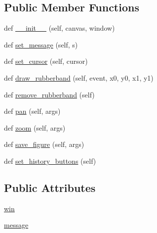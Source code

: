 \subsection*{Public Member Functions}
\begin{DoxyCompactItemize}
\item 
def \hyperlink{classmatplotlib_1_1backends_1_1backend__gtk3_1_1NavigationToolbar2GTK3_a44f0c09dae98b4a1d28de4ec2aa51824}{\+\_\+\+\_\+init\+\_\+\+\_\+} (self, canvas, window)
\item 
def \hyperlink{classmatplotlib_1_1backends_1_1backend__gtk3_1_1NavigationToolbar2GTK3_a5d93a7304eeac3de015b910a6f7deb79}{set\+\_\+message} (self, s)
\item 
def \hyperlink{classmatplotlib_1_1backends_1_1backend__gtk3_1_1NavigationToolbar2GTK3_afb5f5925aff9dbb9cd59b1b1ce18c288}{set\+\_\+cursor} (self, cursor)
\item 
def \hyperlink{classmatplotlib_1_1backends_1_1backend__gtk3_1_1NavigationToolbar2GTK3_ab05cfd7a22974a977b1b54d266f61f8f}{draw\+\_\+rubberband} (self, event, x0, y0, x1, y1)
\item 
def \hyperlink{classmatplotlib_1_1backends_1_1backend__gtk3_1_1NavigationToolbar2GTK3_ae753d6238f46be24a488c742d9a9d16a}{remove\+\_\+rubberband} (self)
\item 
def \hyperlink{classmatplotlib_1_1backends_1_1backend__gtk3_1_1NavigationToolbar2GTK3_ae6ef9c5493bec27282e6d66922513b8d}{pan} (self, args)
\item 
def \hyperlink{classmatplotlib_1_1backends_1_1backend__gtk3_1_1NavigationToolbar2GTK3_aceb3d50600ca50ec4c0fb3c25129dfdc}{zoom} (self, args)
\item 
def \hyperlink{classmatplotlib_1_1backends_1_1backend__gtk3_1_1NavigationToolbar2GTK3_a539d45c52b7fd84a20c0c7b5cb3608b6}{save\+\_\+figure} (self, args)
\item 
def \hyperlink{classmatplotlib_1_1backends_1_1backend__gtk3_1_1NavigationToolbar2GTK3_adc29aeec1686d962e8bf5120bad5353a}{set\+\_\+history\+\_\+buttons} (self)
\end{DoxyCompactItemize}
\subsection*{Public Attributes}
\begin{DoxyCompactItemize}
\item 
\hyperlink{classmatplotlib_1_1backends_1_1backend__gtk3_1_1NavigationToolbar2GTK3_a586a0ded2b7e445e66e6f568f9c11623}{win}
\item 
\hyperlink{classmatplotlib_1_1backends_1_1backend__gtk3_1_1NavigationToolbar2GTK3_aa73cfad19e2465a68a4827ee010af41f}{message}
\end{DoxyCompactItemize}
